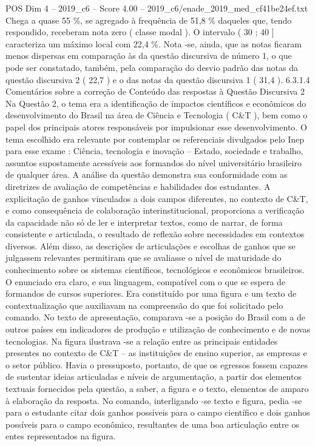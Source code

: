 \begin{textsample}{POS Dim 4 – 2019\_c6 – Score 4.00 – 2019\_c6/enade\_2019\_med\_cf41be24ef.txt}
Chega a quase 55 \%, se agregado à frequência de 51,8 \% daqueles que, tendo respondido, receberam nota zero ( classe modal ).
O intervalo ( 30 ; 40 ] caracteriza um máximo local com 22,4 \%.
Nota -se, ainda, que as notas ficaram menos dispersas em comparação às da questão discursiva de número 1, o que pode ser constatado, também, pela comparação do desvio padrão das notas da questão discursiva 2 ( 22,7 ) e o das notas da questão discursiva 1 ( 31,4 ). 6.3.1.4 Comentários sobre a correção de Conteúdo das respostas à Questão Discursiva 2 Na Questão 2, o tema era a identificação de impactos científicos e econômicos do desenvolvimento do Brasil na área de Ciência e Tecnologia ( C\&T ), bem como o papel dos principais atores responsáveis por impulsionar esse desenvolvimento.
O tema escolhido era relevante por contemplar os referenciais divulgados pelo Inep para esse exame : Ciência, tecnologia e inovação – Estado, sociedade e trabalho, assuntos supostamente acessíveis aos formandos do nível universitário brasileiro de qualquer área.
A análise da questão demonstra sua conformidade com as diretrizes de avaliação de competências e habilidades dos estudantes.
A explicitação de ganhos vinculados a dois campos diferentes, no contexto de C\&T, e como consequência de colaboração interinstitucional, proporciona a verificação da capacidade não só de ler e interpretar textos, como de narrar, de forma consistente e articulada, o resultado de reflexão sobre necessidades em contextos diversos.
Além disso, as descrições de articulações e escolhas de ganhos que se julgassem relevantes permitiram que se avaliasse o nível de maturidade do conhecimento sobre os sistemas científicos, tecnológicos e econômicos brasileiros.
O enunciado era claro, e sua linguagem, compatível com o que se espera de formandos de cursos superiores.
Era constituído por uma figura e um texto de contextualização que auxiliavam na compreensão do que foi solicitado pelo comando.
No texto de apresentação, comparava -se a posição do Brasil com a de outros países em indicadores de produção e utilização de conhecimento e de novas tecnologias.
Na figura ilustrava -se a relação entre as principais entidades presentes no contexto de C\&T – as instituições de ensino superior, as empresas e o setor público.
Havia o pressuposto, portanto, de que os egressos fossem capazes de sustentar ideias articuladas e níveis de argumentação, a partir dos elementos textuais fornecidos pela questão, a saber, a figura e o texto, elementos de amparo à elaboração da resposta.
No comando, interligando -se texto e figura, pedia -se para o estudante citar dois ganhos possíveis para o campo científico e dois ganhos possíveis para o campo econômico, resultantes de uma boa articulação entre os entes representados na figura.

\end{textsample}
